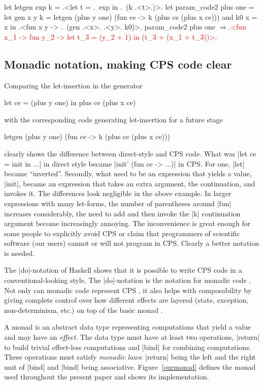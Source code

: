 \documentclass{elsart}
\newcommand{\evalresult}[1]{\ensuremath{\Longrightarrow}\textcolor{red}{#1}}
\begin{document}
\begin{code}[commandchars=\\\{\}]
let letgen exp k = .<let t = .~exp in .~(k .<t>.)>.
let param_code2 plus one =
  let gen x y k = letgen (plus y one)
                         (fun ce -> k (plus ce (plus x ce)))
  and k0 x = x
  in .<fun x y -> .~(gen .<x>. .<y>. k0)>.
param_code2 plus one
\evalresult{.<fun x_1 -> fun y_2 -> let t_3 = (y_2 + 1) in (t_3 + (x_1 + t_3))>.}
\end{code}

\subsection{Monadic notation, making CPS code clear}\label{monadicnotation}

Comparing the let-insertion in the generator
\begin{code}
let ce = (plus y one) in  plus ce (plus x ce)
\end{code}
with the corresponding code generating let-insertion for a future
stage
\begin{code}
letgen (plus y one) (fun ce -> k (plus ce (plus x ce)))
\end{code}
clearly shows the difference between  direct-style and CPS code.
What was |let ce = init in ...| in direct style became
|init' (fun ce -> ...)| in CPS. For one, |let| became
``inverted''. Secondly, what used to be an expression that yields
a value, |init|, became an expression that takes an extra argument,
the continuation, and invokes it. The differences look negligible in
the above example. In larger expressions with many let-forms, the
number of parentheses around |fun| increases considerably, the need to add and
then invoke the |k| continuation argument become increasingly annoying. The
inconvenience is great enough for some people to explicitly avoid CPS
or claim that programmers of scientific software (our users) cannot or will not
program in CPS. Clearly a better notation is needed.

The |do|-notation of Haskell \cite{Haskell98Report} shows that it is possible
to write CPS code in a conventional-looking style. The
|do|-notation is the notation for monadic code \cite{moggi-notions}.
Not only can monadic code represent CPS \cite{Filinski:Representing},
it also helps with composability by giving complete control over how
different effects are layered
(state, exception, non-determinism, etc.) on top of the
basic monad \cite{liang-interpreter}.

A monad \cite{moggi-notions} is an abstract data type representing
computations that yield a value and may have an \emph{effect}.
The data type must have at least two operations, |return| to build
trivial effect-less computations and |bind| for combining
computations. These operations must satisfy \emph{monadic laws}:
|return| being the left and the right unit of |bind| and |bind| being
associative. Figure~\ref{ourmonad} defines the monad used throughout
the present paper and shows its implementation.
\end{document}

